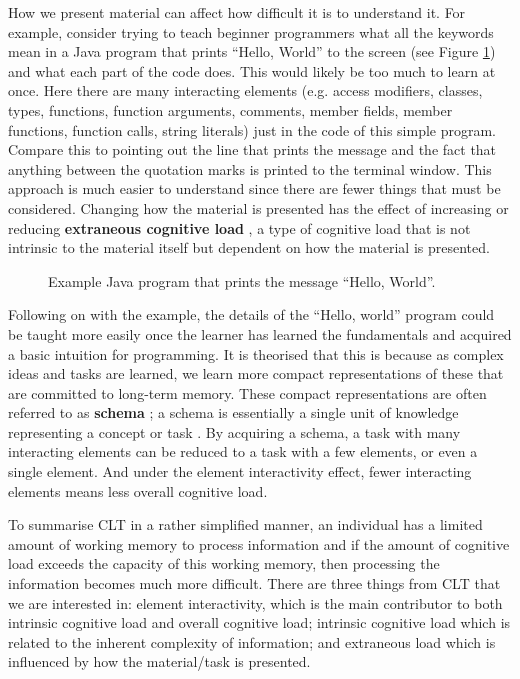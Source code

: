 \documentclass[12pt]{article}
\theoremstyle{grammarstyle}
\newcommand{\keyword}[1]{%
    \textbf{#1}%
}
\begin{document}
How we present material can affect how difficult it is to understand it. For example, consider trying to teach beginner programmers what all the keywords mean in a Java program that prints ``Hello, World'' to the screen (see Figure \ref{fig:java_hello_world}) and what each part of the code does. This would likely be too much to learn at once. Here there are many interacting elements (e.g. access modifiers, classes, types, functions, function arguments, comments, member fields, member functions, function calls, string literals) just in the code of this simple program. Compare this to pointing out the line that prints the message and the fact that anything between the quotation marks is printed to the terminal window. This approach is much easier to understand since there are fewer things that must be considered. Changing how the material is presented has the effect of increasing or reducing \keyword{extraneous cognitive load}, a type of cognitive load that is not intrinsic to the material itself but dependent on how the material is presented.

\begin{figure}
    \centering
     \lstset{xleftmargin=20pt}
    
    \caption{Example Java program that prints the message ``Hello, World''.}
    \label{fig:java_hello_world}
\end{figure}

Following on with the example, the details of the ``Hello, world'' program could be taught more easily once the learner has learned the fundamentals and acquired a basic intuition for programming. It is theorised that this is because as complex ideas and tasks are learned, we learn more compact representations of these that are committed to long-term memory. These compact representations are often referred to as \keyword{schema}; a schema is essentially a single unit of knowledge representing a concept or task \citep{axelrod1973schema, abelson1981psychological, bartlett1995remembering}. By acquiring a schema, a task with many interacting elements can be reduced to a task with a few elements, or even a single element. And under the element interactivity effect, fewer interacting elements means less overall cognitive load.

To summarise CLT in a rather simplified manner, an individual has a limited amount of working memory to process information and if the amount of cognitive load exceeds the capacity of this working memory, then processing the information becomes much more difficult. There are three things from CLT that we are interested in: element interactivity, which is the main contributor to both intrinsic cognitive load and overall cognitive load; intrinsic cognitive load which is related to the inherent complexity of information; and extraneous load which is influenced by how the material/task is presented.
\end{document}
